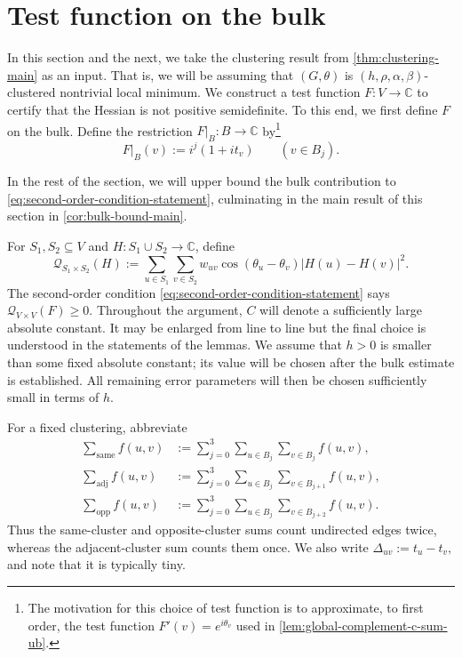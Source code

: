 \documentclass[reqno,11pt]{amsart}
\theoremstyle{definition}
\newcommand{\CC}{\mathbb{C}}
\newcommand{\cQ}{\mathcal{Q}}
\newcommand{\abs}[1]{\left\lvert #1\right\rvert}
\begin{document}
\section{Test function on the bulk}\label{sec:bulk}
In this section and the next, we take the clustering result from \cref{thm:clustering-main} as an input. That is, we will be assuming that $(G,\theta)$ is $(h,\rho,\alpha,\beta)$-clustered nontrivial local minimum.  We construct a test function $F : V \to \CC$ to certify that the Hessian is not positive semidefinite.  To this end, we first define $F$ on the bulk. Define the restriction $F\vert_B\colon B\to\CC$ by\footnote{The motivation for this choice of test function is to approximate, to first order, the test function $F'(v) = e^{i\theta_v}$ used in \cref{lem:global-complement-c-sum-ub}.}
\begin{equation}\label{eq:test-function-bulk}
    F\vert_B(v):=i^j(1+it_v)\qquad(v\in B_j).
\end{equation}

In the rest of the section, we will upper bound the bulk contribution to \eqref{eq:second-order-condition-statement}, culminating in the main result of this section in \cref{cor:bulk-bound-main}. 

\medskip


For $S_1,S_2\subseteq V$ and $H\colon S_1\cup S_2\to\CC$, define
\[
\cQ_{S_1\times S_2}(H)
:=\sum_{u\in S_1}\sum_{v\in S_2}
 w_{uv}\cos(\theta_u-\theta_v)\abs{H(u)-H(v)}^2.
\]
The second-order condition \eqref{eq:second-order-condition-statement} says $\cQ_{V\times V}(F)\ge 0$. 
Throughout the argument, $C$ will denote a sufficiently large absolute
constant.  It may be enlarged from line to line but the final choice is understood in the statements of the lemmas.  We assume that $h>0$ is smaller than some fixed absolute constant; its value will be chosen after the bulk estimate is established.  All remaining error parameters will then be chosen sufficiently small in terms of $h$.

For a fixed clustering, abbreviate
\begin{align*}
\sum_{\mathrm{same}}f(u,v)
&:=\sum_{j=0}^3\sum_{u\in B_j}\sum_{v\in B_j}f(u,v),\\
\sum_{\mathrm{adj}}f(u,v)
&:=\sum_{j=0}^3\sum_{u\in B_j}\sum_{v\in B_{j+1}}f(u,v),\\
\sum_{\mathrm{opp}}f(u,v)
&:=\sum_{j=0}^3\sum_{u\in B_j}\sum_{v\in B_{j+2}}f(u,v).
\end{align*}
Thus the same-cluster and opposite-cluster sums count undirected edges twice, whereas the adjacent-cluster sum counts them once.  We also write $\Delta_{uv}:=t_u-t_v,$ and note that it is typically tiny.
\end{document}
